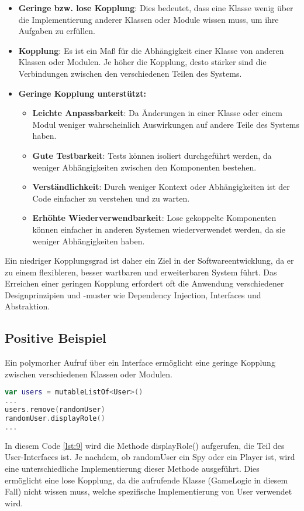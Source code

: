 \begin{itemize}
    \item \textbf{Geringe bzw. lose Kopplung}: Dies bedeutet, dass eine Klasse wenig über die Implementierung anderer Klassen oder Module wissen muss, um ihre Aufgaben zu erfüllen.
    \item \textbf{Kopplung}: Es ist ein Maß für die Abhängigkeit einer Klasse von anderen Klassen oder Modulen. Je höher die Kopplung, desto stärker sind die Verbindungen zwischen den verschiedenen Teilen des Systems.
    \item \textbf{Geringe Kopplung unterstützt:}
    \begin{itemize}
        \item \textbf{Leichte Anpassbarkeit}: Da Änderungen in einer Klasse oder einem Modul weniger wahrscheinlich Auswirkungen auf andere Teile des Systems haben.
        \item \textbf{Gute Testbarkeit}: Tests können isoliert durchgeführt werden, da weniger Abhängigkeiten zwischen den Komponenten bestehen.
        \item \textbf{Verständlichkeit}: Durch weniger Kontext oder Abhängigkeiten ist der Code einfacher zu verstehen und zu warten.
        \item \textbf{Erhöhte Wiederverwendbarkeit}: Lose gekoppelte Komponenten können einfacher in anderen Systemen wiederverwendet werden, da sie weniger Abhängigkeiten haben.
    \end{itemize}
\end{itemize}

Ein niedriger Kopplungsgrad ist daher ein Ziel in der Softwareentwicklung, da er zu einem flexibleren, besser wartbaren und erweiterbaren System führt. Das Erreichen einer geringen Kopplung erfordert oft die Anwendung verschiedener Designprinzipien und -muster wie Dependency Injection, Interfaces und Abstraktion.

\subsection*{Positive Beispiel}
Ein polymorher Aufruf über ein Interface ermöglicht eine geringe Kopplung zwischen verschiedenen Klassen oder Modulen.

\begin{lstlisting}[language=Kotlin, caption={Polymorher Aufruf über ein Interface}, label={lst:9}]
var users = mutableListOf<User>()
...
users.remove(randomUser)
randomUser.displayRole()
...
\end{lstlisting}
In diesem Code \ref{lst:9} wird die Methode displayRole() aufgerufen, die Teil des User-Interfaces ist. Je nachdem, ob randomUser ein Spy oder ein Player ist, wird eine unterschiedliche Implementierung dieser Methode ausgeführt. Dies ermöglicht eine lose Kopplung, da die aufrufende Klasse (GameLogic in diesem Fall) nicht wissen muss, welche spezifische Implementierung von User verwendet wird.

